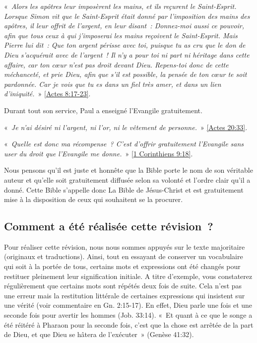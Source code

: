 \begin{small}
«~\emph{Alors les apôtres leur imposèrent les mains, et ils reçurent le Saint-Esprit. Lorsque Simon vit que le Saint-Esprit était donné par l'imposition des mains des apôtres, il leur offrit de l'argent, en leur disant~: Donnez-moi aussi ce pouvoir, afin que tous ceux à qui j'imposerai les mains reçoivent le Saint-Esprit. Mais Pierre lui dit~: Que ton argent périsse avec toi, puisque tu as cru que le don de Dieu s'acquérait avec de l'argent~! Il n'y a pour toi ni part ni héritage dans cette affaire, car ton cœur n'est pas droit devant Dieu. Repens-toi donc de cette méchanceté, et prie Dieu, afin que s'il est possible, la pensée de ton cœur te soit pardonnée. Car je vois que tu es dans un fiel très amer, et dans un lien d'iniquité.}~» \vref{Actes 8:17-23}.

Durant tout son service, Paul a enseigné l'Evangile gratuitement.

«~\emph{Je n'ai désiré ni l'argent, ni l'or, ni le vêtement de personne.}~» \vref{Actes 20:33}.

«~\emph{Quelle est donc ma récompense~? C'est d'offrir gratuitement l'Evangile sans user du droit que l'Evangile me donne.}~» \vref{1 Corinthiens 9:18}.

Nous pensons qu'il est juste et honnête que la Bible porte le nom de son véritable auteur et qu'elle soit gratuitement diffusée selon sa volonté et l'ordre clair qu'il a donné. Cette Bible s'appelle donc La Bible de Jésus-Christ et est gratuitement mise à la disposition de ceux qui souhaitent se la procurer. 

\subsection*{Comment a été réalisée cette révision~?}

Pour réaliser cette révision, nous nous sommes appuyés sur le texte majoritaire (originaux et traductions). Ainsi, tout en essayant de conserver un vocabulaire qui soit à la portée de tous, certains mots et expressions ont été changés pour restituer pleinement leur signification initiale. A titre d'exemple, vous constaterez régulièrement que certains mots sont répétés deux fois de suite. Cela n'est pas une erreur mais la restitution littérale de certaines expressions qui insistent sur une vérité (voir commentaire en Gn. 2:15-17). En effet, Dieu parle une fois et une seconde fois pour avertir les hommes (Job. 33:14). «~Et quant à ce que le songe a été réitéré à Pharaon pour la seconde fois, c'est que la chose est arrêtée de la part de Dieu, et que Dieu se hâtera de l'exécuter~» (Genèse 41:32).


\end{small}
